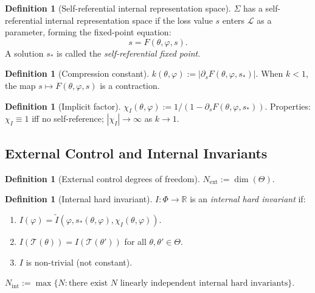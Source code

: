 \documentclass[12pt,a4paper]{article}
\theoremstyle{definition}
\newtheorem{definition}[theorem]{Definition}
\newcommand{\mL}{\mathcal{L}}
\newcommand{\mT}{\mathcal{T}}
\newcommand{\mPhi}{\Phi}
\newcommand{\mTheta}{\Theta}
\newcommand{\R}{\mathbb{R}}
\newcommand{\chiI}{\chi_I}
\newcommand{\Nint}{N_{\mathrm{int}}}
\newcommand{\Next}{N_{\mathrm{ext}}}
\begin{document}
\begin{definition}[Self-referential internal representation space]
\label{def:sr}
$\Sigma$ has a self-referential internal representation space if the loss value $s$ enters $\mL$ as a parameter, forming the fixed-point equation:
\begin{equation}
\label{eq:sr-fp}
s = F(\theta, \varphi, s).
\end{equation}
A solution $s_*$ is called the \emph{self-referential fixed point}.
\end{definition}

\begin{definition}[Compression constant]
\label{def:k}
$k(\theta, \varphi) := |\partial_s F(\theta, \varphi, s_*)|$. When $k < 1$, the map $s \mapsto F(\theta, \varphi, s)$ is a contraction.
\end{definition}

\begin{definition}[Implicit factor]
\label{def:chi}
$\chiI(\theta, \varphi) := 1/(1 - \partial_s F(\theta, \varphi, s_*))$. Properties: $\chiI \equiv 1$ iff no self-reference; $|\chiI| \to \infty$ as $k \to 1$.
\end{definition}

\subsection{External Control and Internal Invariants}

\begin{definition}[External control degrees of freedom]
\label{def:next}
$\Next := \dim(\mTheta)$.
\end{definition}

\begin{definition}[Internal hard invariant]
\label{def:nint}
$I: \mPhi \to \R$ is an \emph{internal hard invariant} if:
\begin{enumerate}[label=(INV-\arabic*)]
\item $I(\varphi) = \tilde{I}(\varphi, s_*(\theta, \varphi), \chiI(\theta, \varphi))$.
\item $I(\mT(\theta)) = I(\mT(\theta'))$ for all $\theta, \theta' \in \mTheta$.
\item $I$ is non-trivial (not constant).
\end{enumerate}
$\Nint := \max\{N : \text{there exist } N \text{ linearly independent internal hard invariants}\}$.
\end{definition}
\end{document}
